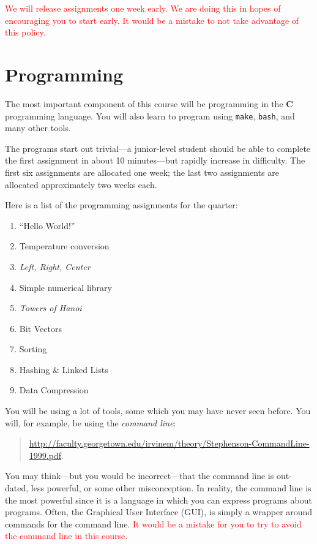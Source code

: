 \documentclass{article}
\begin{document}
\textcolor{red}{We will release assignments one week early. We are doing this
in hopes of encouraging you to start early. It would be a mistake to not take
advantage of this policy.}


\section{Programming}
The most important component of this course will be programming in the
\textbf{C} programming language. You will also learn to program using
\texttt{make}, \texttt{bash}, and many other tools.

The programs start out trivial---a junior-level student should be
able to complete the first assignment in about 10 minutes---but
rapidly increase in difficulty.  The first six assignments are
allocated one week; the last two assignments are allocated approximately
two weeks each. 

Here is a list of the programming assignments for the quarter:
\begin{multicols}{3}
\begin{enumerate}[start=0]
    \item ``Hello World!''
    \item Temperature conversion
    \item \emph{Left, Right, Center}
    \item Simple numerical library
    \item \emph{Towers of Hanoi}
    \item Bit Vectors
\item Sorting
\item Hashing \& Linked Lists
\item Data Compression
\end{enumerate}
\end{multicols}

You will be using a lot of tools, some which you may have never seen before. You
will, for example, be using the \emph{command line}:
\begin{quote}
\centerline{\url{http://faculty.georgetown.edu/irvinem/theory/Stephenson-CommandLine-1999.pdf}.}
\end{quote}
You may think---but you would be incorrect---that the command line is
out-dated, less powerful, or some other misconception. In reality, the command
line is the most powerful since it is a language in which you can express
programs about programs. Often, the Graphical User Interface (GUI), is simply
a wrapper around commands for the command line.
\textcolor{red}{It would be a mistake for you to try to avoid the command line
in this course.}
\end{document}
